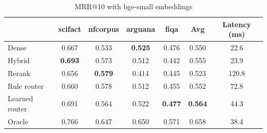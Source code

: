 \begin{table}[t]
\centering
\caption{MRR@10 with bge-small embeddings}
\label{tab:mrr_bge-small}
\begin{tabular}{lcccccc}
\toprule
 & scifact & nfcorpus & arguana & fiqa & Avg & Latency (ms) \\
\midrule
Dense & 0.667 & 0.533 & \textbf{0.525} & 0.476 & 0.550 & 22.6 \\
Hybrid & \textbf{0.693} & 0.573 & 0.512 & 0.442 & 0.555 & 23.9 \\
Rerank & 0.656 & \textbf{0.579} & 0.414 & 0.445 & 0.523 & 120.8 \\
\midrule
Rule router & 0.660 & 0.578 & 0.512 & 0.455 & 0.552 & 72.8 \\
Learned router & 0.691 & 0.564 & 0.522 & \textbf{0.477} & \textbf{0.564} & 44.3 \\
Oracle & 0.766 & 0.647 & 0.650 & 0.571 & 0.658 & 38.4 \\
\bottomrule
\end{tabular}
\end{table}